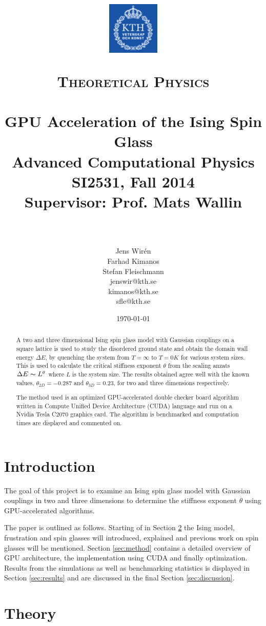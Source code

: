 \documentclass[paper=a4, fontsize=11pt]{scrartcl} %
\title{
\vspace{-2.5cm}
\begin{center}
\includegraphics[width=2.5cm]{logo-kth.png}\\[-1mm]
\hspace{-3mm}
\end{center}
\normalfont \normalsize
\textsc{Theoretical Physics} \\ [25pt] %
\horrule{0.5pt} \\[0.4cm] %
\huge GPU Acceleration of the Ising Spin Glass \\ %
\Large Advanced Computational Physics\\ %
\Large SI2531, Fall 2014\\ %
\Large Supervisor: Prof. Mats Wallin \\ %
\horrule{2pt} \\[0.5cm] %
}
\author{Jens Wir\'{e}n \\
Farhad Kimanos \\
Stefan Fleischmann \\
\normalsize jenswir@kth.se \\
\normalsize kimanos@kth.se \\
\normalsize sfle@kth.se} %
\date{\normalsize\today} %
\numberwithin{equation}{section} %
\numberwithin{figure}{section} %
\numberwithin{table}{section} %
\begin{document}
\maketitle %


\begin{abstract}
A two and three dimensional Ising spin glass model with Gaussian couplings on a square lattice is used to study the disordered ground state and obtain the domain wall energy $\Delta E$, by quenching the system from $T=\infty$ to $T=0 K$ for various system sizes. This is used to calculate the critical stiffness exponent $\theta$ from the scaling anzats $\Delta E \thicksim L^\theta$ where $L$ is the system size. The results obtained agree well with the known values, $\theta_{2D}=-0.287$ and $\theta_{3D}=0.23$, for two and three dimensions respectively.

The method used is an optimized GPU-accelerated double checker board algorithm written in Compute Unified Device Architecture (CUDA) language and run on a Nvidia Tesla C2070 graphics card. The algorithm is benchmarked and computation times are displayed and commented on.
\end{abstract}

\pagebreak

\section{Introduction}

The goal of this project is to examine an Ising spin glass model with Gaussian couplings in two and three dimensions to determine the stiffness exponent $\theta$ using GPU-accelerated algorithms. 

The paper is outlined as follows. Starting of in Section \ref{sec:theory} the Ising model, frustration and spin glasses will introduced, explained and previous work on spin glasses will be mentioned. Section \ref{sec:method} contains a detailed overview of GPU architecture, the implementation using CUDA and finally optimization. Results from the simulations as well as benchmarking statistics is displayed in Section \ref{sec:results} and are discussed in the final Section \ref{sec:discussion}.

\section{Theory}
\label{sec:theory}
\end{document}
